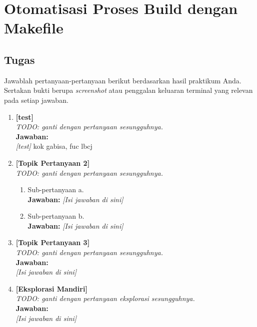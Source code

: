 
\chapter{Otomatisasi Proses Build dengan Makefile}
\label{chap:handson-03}

\section{Tugas}

Jawablah pertanyaan-pertanyaan berikut berdasarkan hasil praktikum Anda.
Sertakan bukti berupa \textit{screenshot} atau penggalan keluaran terminal
yang relevan pada setiap jawaban.

\begin{enumerate}
    \item \textbf{[test]}\\
    \textit{TODO: ganti dengan pertanyaan sesungguhnya.}\\[0.3cm]
    \textbf{Jawaban:}\\
    \textit{[test]}
    kok gabisa, fuc lbcj

    \item \textbf{[Topik Pertanyaan 2]}\\
    \textit{TODO: ganti dengan pertanyaan sesungguhnya.}
    \begin{enumerate}
        \item[(a)] Sub-pertanyaan a.\\
        \textbf{Jawaban:} \textit{[Isi jawaban di sini]}
        \item[(b)] Sub-pertanyaan b.\\
        \textbf{Jawaban:} \textit{[Isi jawaban di sini]}
    \end{enumerate}

    \item \textbf{[Topik Pertanyaan 3]}\\
    \textit{TODO: ganti dengan pertanyaan sesungguhnya.}\\[0.3cm]
    \textbf{Jawaban:}\\
    \textit{[Isi jawaban di sini]}

    \item \textbf{[Eksplorasi Mandiri]}\\
    \textit{TODO: ganti dengan pertanyaan eksplorasi sesungguhnya.}\\[0.3cm]
    \textbf{Jawaban:}\\
    \textit{[Isi jawaban di sini]}
\end{enumerate}